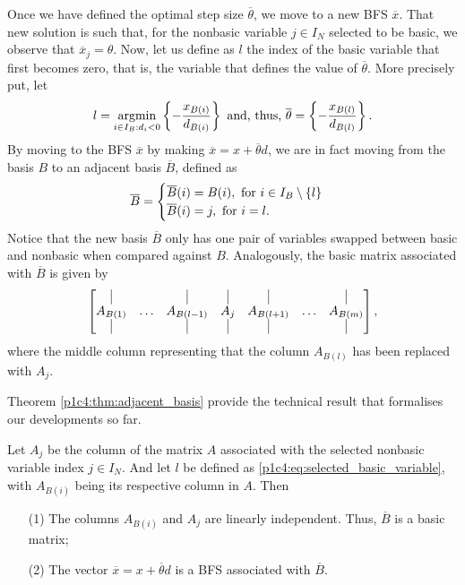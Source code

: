 Once we have defined the optimal step size $\overline{\theta}$, we move to a new BFS $\overline{x}$. That new solution is such that, for the nonbasic variable $j \in I_N$ selected to be basic, we observe that $\overline{x}_j = \theta$. Now, let us define as $l$ the index of the basic variable that first becomes zero, that is, the variable that defines the value of $\overline{\theta}$. More precisely put, let 
%
\begin{equation}
	l = \mathop{\rm argmin}_{i \in I_B : d_i <0}	\left\{ -\frac{x_{B(i)}}{d_{B(i)}} \right \} \text{ and, thus, } \overline{\theta} = \left\{ -\frac{x_{B(l)}}{d_{B(l)}} \right \}. \label{p1c4:eq:selected_basic_variable}	
\end{equation}
%
By moving to the BFS $\overline{x}$ by making $\overline{x} = x + \overline{\theta}d$, we are in fact moving from the basis $B$ to an adjacent basis $\overline{B}$, defined as
%
\begin{equation*}
	\overline{B} = 
		\begin{cases} 
			\overline{B}(i) = B(i), \text{ for }i \in I_B \setminus \left\{ l \right \} \\
			\overline{B}(i) = j, \text{ for } i = l. 
		\end{cases}
\end{equation*}
%
Notice that the new basis $\overline{B}$ only has one pair of variables swapped between basic and nonbasic when compared against $B$. Analogously, the basic matrix associated with $\overline{B}$ is given by 
%
\begin{equation*}
	\begin{bmatrix}
		\vline   &  & \vline & \vline & \vline &  & \vline \\
		A_{B(1)} & \dots & A_{B(l-1)} & A_j &  A_{B(l+1)} & \dots & A_{B(m)} \\
		\vline   &  & \vline & \vline & \vline &  & \vline 
	\end{bmatrix},	
\end{equation*}
%
where the middle column representing that the column $A_{B(l)}$ has been replaced with $A_j$. 

Theorem \ref{p1c4:thm:adjacent_basis} provide the technical result that formalises our developments so far.

\begin{theorem} \label{p1c4:thm:adjacent_basis}
	Let $A_j$ be the column of the matrix $A$ associated with the selected nonbasic variable index $j \in I_N$. And let $l$ be defined as \eqref{p1c4:eq:selected_basic_variable}, with $A_{B(i)}$ being its respective column in $A$. Then	 
	\begin{enumerate}
		\item[(1)] The columns $A_{B(i)}$ and $A_j$ are linearly independent. Thus, $\overline{B}$ is a basic matrix;
		\item[(2)] The vector $\overline{x} = x + \overline{\theta}d$ is a BFS associated with $\overline{B}$.
	\end{enumerate}
\end{theorem}

